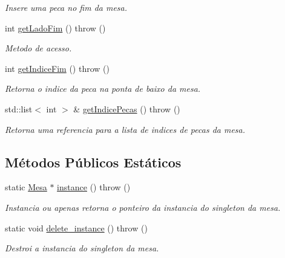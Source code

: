 \begin{DoxyCompactItemize}
\begin{DoxyCompactList}\small\item\em Insere uma peca no fim da mesa. \item\end{DoxyCompactList}\item 
int \hyperlink{classMesa_a9c1e133003090c88d1d2c6672d67f3d8}{getLadoFim} ()  throw ()
\begin{DoxyCompactList}\small\item\em Metodo de acesso. \item\end{DoxyCompactList}\item 
int \hyperlink{classMesa_ad86df6da9b91e2a5271880dd12002981}{getIndiceFim} ()  throw ()
\begin{DoxyCompactList}\small\item\em Retorna o indice da peca na ponta de baixo da mesa. \item\end{DoxyCompactList}\item 
std::list$<$ int $>$ \& \hyperlink{classMesa_a362745924772f384bb8fc7039a6bb6b7}{getIndicePecas} ()  throw ()
\begin{DoxyCompactList}\small\item\em Retorna uma referencia para a lista de indices de pecas da mesa. \item\end{DoxyCompactList}\end{DoxyCompactItemize}
\subsection*{Métodos Públicos Estáticos}
\begin{DoxyCompactItemize}
\item 
static \hyperlink{classMesa}{Mesa} $\ast$ \hyperlink{classMesa_afeb7646c49b1269a0c5e5a605b72c21b}{instance} ()  throw ()
\begin{DoxyCompactList}\small\item\em Instancia ou apenas retorna o ponteiro da instancia do singleton da mesa. \item\end{DoxyCompactList}\item 
\hypertarget{classMesa_a78e2890157e5be6829a72d1abaa418ce}{
static void \hyperlink{classMesa_a78e2890157e5be6829a72d1abaa418ce}{delete\_\-instance} ()  throw ()}
\label{classMesa_a78e2890157e5be6829a72d1abaa418ce}

\begin{DoxyCompactList}\small\item\em Destroi a instancia do singleton da mesa. \item\end{DoxyCompactList}\end{DoxyCompactItemize}


